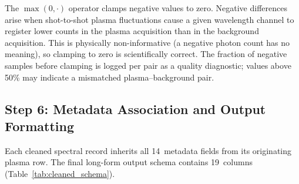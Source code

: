 \documentclass[a4paper,twocolumn,10pt]{article}
\begin{document}
The $\max(0, \cdot)$ operator clamps negative values to zero.
Negative differences arise when shot-to-shot plasma fluctuations cause
a given wavelength channel to register lower counts in the plasma
acquisition than in the background acquisition.  This is physically
non-informative (a negative photon count has no meaning), so clamping
to zero is scientifically correct.  The fraction of negative samples
before clamping is logged per pair as a quality diagnostic; values
above 50\% may indicate a mismatched plasma--background pair.

\subsection{Step 6: Metadata Association and Output Formatting}

Each cleaned spectral record inherits all 14~metadata fields from its
originating plasma row.  The final long-form output schema contains
19~columns (Table~\ref{tab:cleaned_schema}).
\end{document}
